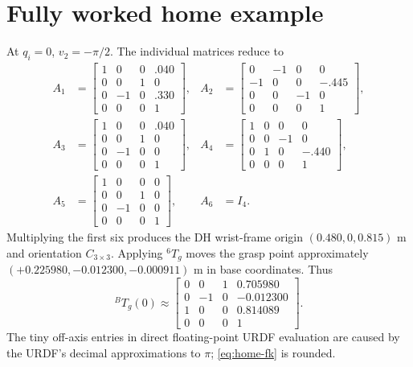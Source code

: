 \section{Fully worked home example}
At $q_i=0$, $v_2=-\pi/2$. The individual matrices reduce to
\begin{align*}
A_1&=\begin{bmatrix}1&0&0&.040\\0&0&1&0\\0&-1&0&.330\\0&0&0&1\end{bmatrix},&
A_2&=\begin{bmatrix}0&-1&0&0\\-1&0&0&-.445\\0&0&-1&0\\0&0&0&1\end{bmatrix},\\
A_3&=\begin{bmatrix}1&0&0&.040\\0&0&1&0\\0&-1&0&0\\0&0&0&1\end{bmatrix},&
A_4&=\begin{bmatrix}1&0&0&0\\0&0&-1&0\\0&1&0&-.440\\0&0&0&1\end{bmatrix},\\
A_5&=\begin{bmatrix}1&0&0&0\\0&0&1&0\\0&-1&0&0\\0&0&0&1\end{bmatrix},&A_6&=I_4.
\end{align*}
Multiplying the first six produces the DH wrist-frame origin $(0.480,0,0.815)$
m and orientation $C_{3\times3}$. Applying ${}^6T_g$ moves the grasp point
approximately $(+0.225980,-0.012300,-0.000911)$ m in base coordinates. Thus
\begin{equation}
 {}^BT_g(0)\approx
 \begin{bmatrix}
 0&0&1&0.705980\\
 0&-1&0&-0.012300\\
 1&0&0&0.814089\\
 0&0&0&1
 \end{bmatrix}.
 \label{eq:home-fk}
\end{equation}
The tiny off-axis entries in direct floating-point URDF evaluation are caused
by the URDF's decimal approximations to $\pi$; \cref{eq:home-fk} is rounded.

